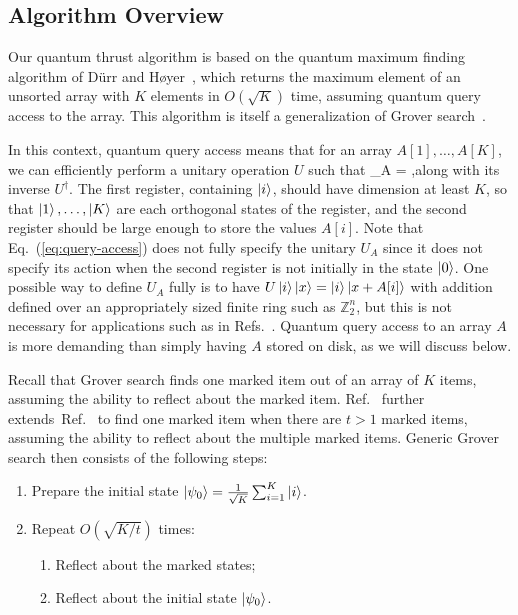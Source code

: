 \documentclass[aps,prd,twocolumn,superscriptaddress,preprintnumbers,nofootinbib,longbibliography,floatfix]{revtex4-1}
\DeclareRobustCommand{\Eq}[1]{Eq.~(\ref{#1})}
\DeclareRobustCommand{\Ref}[1]{Ref.~\cite{#1}}
\DeclareRobustCommand{\Refs}[1]{Refs.~\cite{#1}}
\def\ba#1\ea{\begin{align}#1\end{align}}
\begin{document}
\subsection{Algorithm Overview}
\label{subsec:groveroverview}

Our quantum thrust algorithm is based on the quantum maximum finding algorithm
of D\"urr and H\o{}yer~\cite{Durr:1996nx}, which returns the maximum element of an unsorted array with $K$
elements in $O(\sqrt{K})$ time, assuming quantum query access to the array.
%
This algorithm is itself a generalization of Grover search~\cite{Grover:1996:FQM:237814.237866}.

In this context, quantum query access means that for an array
$A[1],\ldots,A[K]$, we can efficiently perform a unitary operation $U$ such that
\ba U_A  =  ,\label{eq:query-access}\ea along
with its inverse $U^\dag$.  The first register, containing $\ket{i}$, should
have dimension at least $K$, so that $\ket{1},\ldots,\ket{K}$ are each
orthogonal states of the register, and the second register should be large
enough to store the values $A[i]$.  Note that \Eq{eq:query-access} does not
fully specify the unitary $U_A$ since it does not specify its action when the
second register is not initially in the state $\ket 0$. One possible way to
define $U_A$ fully is to have $U\ket{i}\ket{x} = \ket{i}\ket{x + A[i]}$ with
addition defined over an appropriately sized finite ring such as
$\mathbb{Z}_2^n$, but this is not necessary for applications such as
in \Refs{Grover:1996:FQM:237814.237866,Durr:1996nx}.  Quantum query access to an
array $A$ is more demanding than simply having $A$ stored on disk, as we will
discuss below.


Recall that Grover search finds one marked item out of an array of $K$ items, assuming the ability to reflect about the marked item.
%
\Ref{Boyer:1996zf} further extends~\Ref{Grover:1996:FQM:237814.237866} to find one marked item when there are $t > 1$ marked items, assuming the ability to reflect about the multiple marked items.
%
Generic Grover search then consists of the following steps:
%
\begin{enumerate}
    \item Prepare the initial state $\ket{\psi_0}=\frac{1}{\sqrt{K}}\sum_{i=1}^K \ket{i}$.
    \item Repeat $O(\sqrt{K/t})$ times:
    \begin{enumerate}
        \item Reflect about the marked states;
        \item Reflect about the initial state $\ket{\psi_0}$.
    \end{enumerate}
\end{enumerate}
\end{document}
